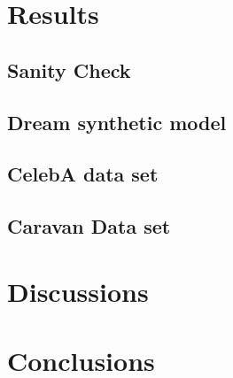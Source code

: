 \documentclass[12pt]{report}
\begin{document}
\newpage






\chapter{Results} 
 
\section{Sanity Check}

\section{Dream synthetic model}

\section{CelebA data set}

\section{Caravan Data set}


\chapter{Discussions} 

\chapter{Conclusions} 

















\newpage

%




	

\printbibliography
\end{document}
